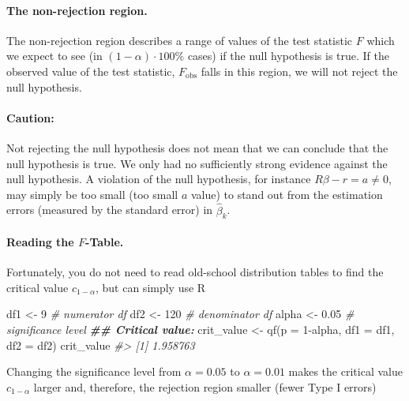 \documentclass[
  14pt,
]{memoir}
\newenvironment{Shaded}{\begin{snugshade}}{\end{snugshade}}
\newcommand{\AttributeTok}[1]{\textcolor[rgb]{0.77,0.63,0.00}{#1}}
\newcommand{\CommentTok}[1]{\textcolor[rgb]{0.56,0.35,0.01}{\textit{#1}}}
\newcommand{\DecValTok}[1]{\textcolor[rgb]{0.00,0.00,0.81}{#1}}
\newcommand{\DocumentationTok}[1]{\textcolor[rgb]{0.56,0.35,0.01}{\textbf{\textit{#1}}}}
\newcommand{\FloatTok}[1]{\textcolor[rgb]{0.00,0.00,0.81}{#1}}
\newcommand{\FunctionTok}[1]{\textcolor[rgb]{0.00,0.00,0.00}{#1}}
\newcommand{\NormalTok}[1]{#1}
\newcommand{\OtherTok}[1]{\textcolor[rgb]{0.56,0.35,0.01}{#1}}
\newcommand{\SpecialCharTok}[1]{\textcolor[rgb]{0.00,0.00,0.00}{#1}}
\begin{document}
\paragraph*{The non-rejection region.}

The non-rejection region describes a range of values of the test statistic \(F\) which we expect to see (in \((1-\alpha) \cdot 100\%\) cases) if the null hypothesis is true. If the observed value of the test statistic, \(F_{\text{obs}}\) falls in this region, we will not reject the null hypothesis.

\paragraph*{Caution:}

Not rejecting the null hypothesis does not mean that we can conclude that the null hypothesis is true. We only had no sufficiently strong evidence against the null hypothesis. A violation of the null hypothesis, for instance \(R\beta -r=a\neq 0\), may simply be too small (too small \(a\) value) to stand out from the estimation errors (measured by the standard error) in \(\hat\beta_k\).

\paragraph*{Reading the $F$-Table.}

Fortunately, you do not need to read old-school distribution tables to find the critical value \(c_{1-\alpha}\), but can simply use \textsf{R}

\begin{Shaded}
\begin{Highlighting}[]
\NormalTok{df1   }\OtherTok{\textless{}{-}} \DecValTok{9}    \CommentTok{\# numerator df}
\NormalTok{df2   }\OtherTok{\textless{}{-}} \DecValTok{120}  \CommentTok{\# denominator df}
\NormalTok{alpha }\OtherTok{\textless{}{-}} \FloatTok{0.05} \CommentTok{\# significance level}
\DocumentationTok{\#\# Critical value:}
\NormalTok{crit\_value }\OtherTok{\textless{}{-}} \FunctionTok{qf}\NormalTok{(}\AttributeTok{p =} \DecValTok{1}\SpecialCharTok{{-}}\NormalTok{alpha, }\AttributeTok{df1 =}\NormalTok{ df1, }\AttributeTok{df2 =}\NormalTok{ df2)}
\NormalTok{crit\_value}
\CommentTok{\#\textgreater{} [1] 1.958763}
\end{Highlighting}
\end{Shaded}

\noindent Changing the significance level from \(\alpha=0.05\) to \(\alpha=0.01\) makes the critical value \(c_{1-\alpha}\) larger and, therefore, the rejection region smaller (fewer Type I errors)
\end{document}
